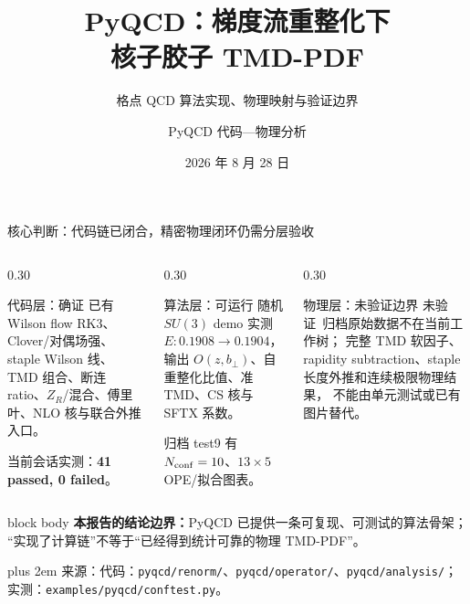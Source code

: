 \documentclass[UTF8,aspectratio=169,11pt]{ctexbeamer}
\title[PyQCD 梯度流胶子 TMD-PDF]{PyQCD：梯度流重整化下\\核子胶子 TMD-PDF}
\subtitle{格点 QCD 算法实现、物理映射与验证边界}
\author[代码—物理分析]{PyQCD 代码—物理分析}
\institute{格点 QCD：从规范组态到可检验的胶子 TMD 链}
\date{2026 年 8 月 28 日}
\newcommand{\source}[1]{%
  \par\vspace{0.02em}\begingroup\fontsize{6}{6.8}\selectfont\raggedright\sloppy
  \setlength{\emergencystretch}{3em}\rightskip=0pt plus 2em
  \color{muted}来源：#1\par\endgroup}
\newcommand{\unverified}{\textcolor{warning}{未验证}}
\begin{document}
\begin{frame}[plain]
  \titlepage
\end{frame}

\begin{frame}[t]{核心判断：代码链已闭合，精密物理闭环仍需分层验收}
  \begin{columns}[T,totalwidth=\textwidth]
    \begin{column}{0.30\textwidth}
      \begin{block}{代码层：确证}
        已有 Wilson flow RK3、Clover/对偶场强、staple Wilson 线、
        TMD 组合、断连 ratio、\(Z_R\)/混合、傅里叶、NLO 核与联合外推入口。

        \vspace{0.2em}
        当前会话实测：\textbf{41 passed, 0 failed}。
      \end{block}
    \end{column}
    \begin{column}{0.30\textwidth}
      \begin{block}{算法层：可运行}
        随机 \(SU(3)\) demo 实测
        \(E:0.1908\to0.1904\)，输出
        \(O(z,b_\perp)\)、自重整化比值、准 TMD、CS 核与 SFTX 系数。

        归档 test9 有 \(N_{\rm conf}=10\)、\(13\times5\) OPE/拟合图表。
      \end{block}
    \end{column}
    \begin{column}{0.30\textwidth}
      \begin{block}{物理层：未验证边界}
        \unverified\ 归档原始数据不在当前工作树；
        完整 TMD 软因子、rapidity subtraction、staple 长度外推和连续极限物理结果，
        不能由单元测试或已有图片替代。
      \end{block}
    \end{column}
  \end{columns}
  \vfill
  \begin{beamercolorbox}[wd=0.98\textwidth,sep=0.65em,rounded=true]{block body}
    \textbf{本报告的结论边界：}PyQCD 已提供一条可复现、可测试的算法骨架；
    “实现了计算链”不等于“已经得到统计可靠的物理 TMD-PDF”。
  \end{beamercolorbox}
  \source{代码：\nolinkurl{pyqcd/renorm/}、\nolinkurl{pyqcd/operator/}、\nolinkurl{pyqcd/analysis/}；实测：\nolinkurl{examples/pyqcd/conftest.py}。}
\end{frame}
\end{document}
